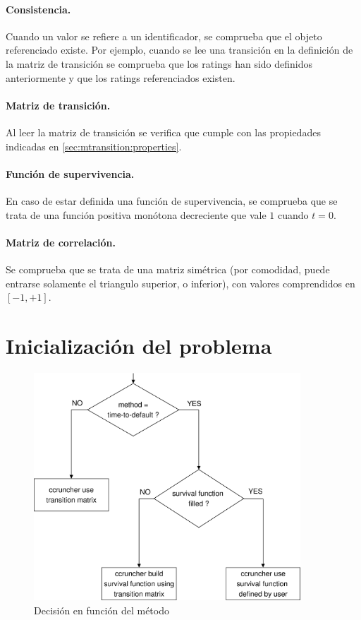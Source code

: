 \paragraph{Consistencia.} Cuando un valor se refiere a un identificador,
se comprueba que el objeto referenciado existe. Por ejemplo, cuando se
lee una transici\'on en la definici\'on de la matriz de transici\'on se
comprueba que los ratings han sido definidos anteriormente y que los
ratings referenciados existen.

\paragraph{Matriz de transici\'on.} Al leer la matriz de transici\'on
se verifica que cumple con las propiedades indicadas en
\ref{sec:mtransition:properties}.

\paragraph{Funci\'on de supervivencia.} En caso de estar definida
una funci\'on de supervivencia, se comprueba que se trata de una
funci\'on positiva mon\'otona decreciente que vale $1$ cuando $t=0$.

\paragraph{Matriz de correlaci\'on.} Se comprueba que se trata de
una matriz sim\'etrica (por comodidad, puede entrarse solamente
el triangulo superior, o inferior), con valores comprendidos
en $[-1,+1]$.


\section{Inicializaci\'on del problema}


\begin{figure}[!hb]
\begin{center}
\includegraphics[width=10cm,angle=0]{./images/decisiontree1.eps}
\caption{Decisi\'on en funci\'on del m\'etodo}
\label{decisiontree1}
\end{center}
\end{figure}

